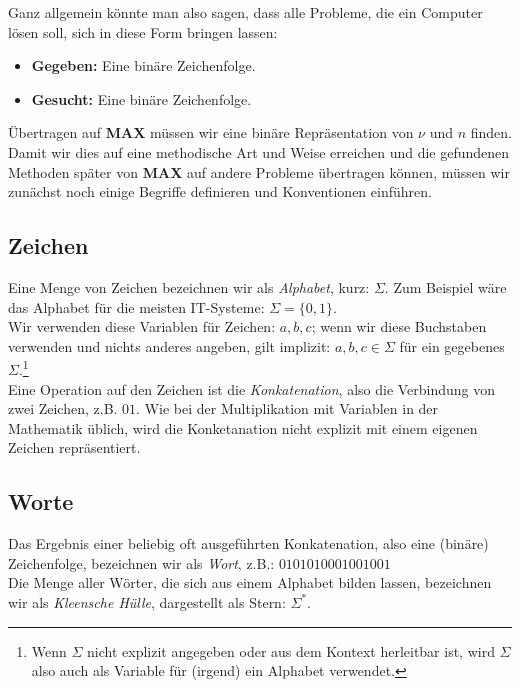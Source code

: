 Ganz allgemein könnte man also sagen, dass alle Probleme, die ein Computer lösen soll,
sich in diese Form bringen lassen:
\begin{itemize}
    \item \textbf{Gegeben:} Eine binäre Zeichenfolge.
    \item \textbf{Gesucht:} Eine binäre Zeichenfolge.
\end{itemize}
Übertragen auf \textbf{MAX} müssen wir eine binäre Repräsentation von $\nu$ und $n$ finden.
Damit wir dies auf eine methodische Art und Weise erreichen
und die gefundenen Methoden später von \textbf{MAX} auf andere Probleme übertragen können,
müssen wir zunächst noch einige Begriffe definieren und Konventionen einführen.

\subsection{Zeichen}

Eine Menge von Zeichen bezeichnen wir als \emph{Alphabet}, kurz: $\Sigma$.
Zum Beispiel wäre das Alphabet für die meisten IT-Systeme: $\Sigma = \{0,1\}$.\\

\noindent
Wir verwenden diese Variablen für Zeichen: $a,b,c$;
wenn wir diese Buchstaben verwenden und nichts anderes angeben,
gilt implizit: $a, b, c \in \Sigma$ für ein gegebenes $\Sigma$.\footnote{
Wenn $\Sigma$ nicht explizit angegeben oder aus dem Kontext herleitbar ist,
wird $\Sigma$ also auch als Variable für (irgend) ein Alphabet verwendet.}\\

\noindent
Eine Operation auf den Zeichen ist die \emph{Konkatenation},
also die Verbindung von zwei Zeichen, z.B. $01$.
Wie bei der Multiplikation mit Variablen in der Mathematik üblich,
wird die Konketanation nicht explizit mit einem eigenen Zeichen repräsentiert.

\subsection{Worte}
Das Ergebnis einer beliebig oft ausgeführten Konkatenation,
also eine (binäre) Zeichenfolge,
bezeichnen wir als \emph{Wort}, z.B.: $0101010001001001$\\

\noindent
Die Menge aller Wörter,
die sich aus einem Alphabet bilden lassen,
bezeichnen wir als \emph{Kleensche Hülle}, dargestellt als Stern: $\Sigma^*$.\\

